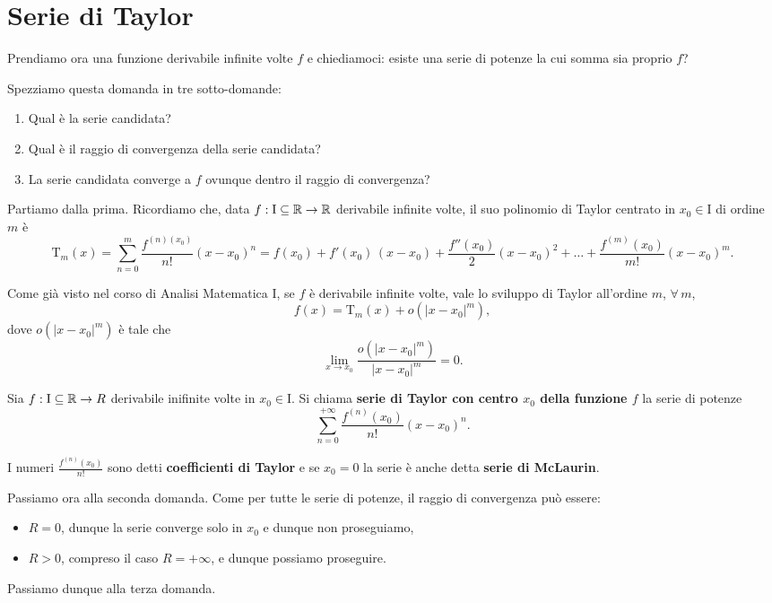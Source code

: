 \documentclass[../../analisi2]{subfiles}
\begin{document}
    \chapter{Serie di Taylor}

        Prendiamo ora una funzione derivabile infinite volte \(f\) e chiediamoci: esiste una serie di potenze la cui somma
        sia proprio \(f\)?

        Spezziamo questa domanda in tre sotto-domande:
        \begin{enumerate}
            \item Qual è la serie candidata?
            \item Qual è il raggio di convergenza della serie candidata?
            \item La serie candidata converge a \(f\) ovunque dentro il raggio di convergenza?
        \end{enumerate}

        Partiamo dalla prima. Ricordiamo che, data \(f : \mathrm{I} \subseteq \mathbb{R} \to \mathbb{R}\) derivabile infinite volte, il suo
        polinomio di Taylor centrato in \(x_0 \in \mathrm{I}\) di ordine \(m\) è
        \[
            \mathrm{T}_m (x) = \sum_{n = 0}^{m} \frac{f^{(n) (x_0)}}{n!} (x - x_0)^n = f(x_0) + f'(x_0) \, (x - x_0) + \frac{f''(x_0)}{2} (x - x_0)^2 + \ldots + \frac{f^{(m)} (x_0)}{m!} (x - x_0)^m.
        \]
        
        Come già visto nel corso di Analisi Matematica I, se \(f\) è derivabile infinite volte, vale lo sviluppo di Taylor
        all'ordine \(m\), \(\forall \, m\),
        \[
            f(x) = \mathrm{T}_m (x) + o(|x - x_0|^m),
        \]
        dove \(o(|x - x_0|^m)\) è tale che
        \[
            \lim_{x \to x_0} \frac{o(|x - x_0|^m)}{|x - x_0|^m} = 0.
        \]

        \begin{definizione}
            Sia \(f : \mathrm{I} \subseteq \mathbb{R} \to R\) derivabile inifinite volte in \(x_0 \in \mathrm{I}\). Si chiama
            \textbf{serie di Taylor con centro \(x_0\) della funzione \(f\)} la serie di potenze
            \[
                \sum_{n = 0}^{+\infty} \frac{f^{(n)} (x_0)}{n!} (x - x_0)^n.
            \]

            I numeri \(\frac{f^{(n)} (x_0)}{n!}\) sono detti \textbf{coefficienti di Taylor} e se \(x_0 = 0\) la serie è anche
            detta \textbf{serie di McLaurin}.
        \end{definizione}

        Passiamo ora alla seconda domanda. Come per tutte le serie di potenze, il raggio di convergenza può essere:
        \begin{itemize}
            \item \(R = 0\), dunque la serie converge solo in \(x_0\) e dunque non proseguiamo,
            \item \(R > 0\), compreso il caso \(R = +\infty\), e dunque possiamo proseguire.
        \end{itemize}

        Passiamo dunque alla terza domanda.
\end{document}
